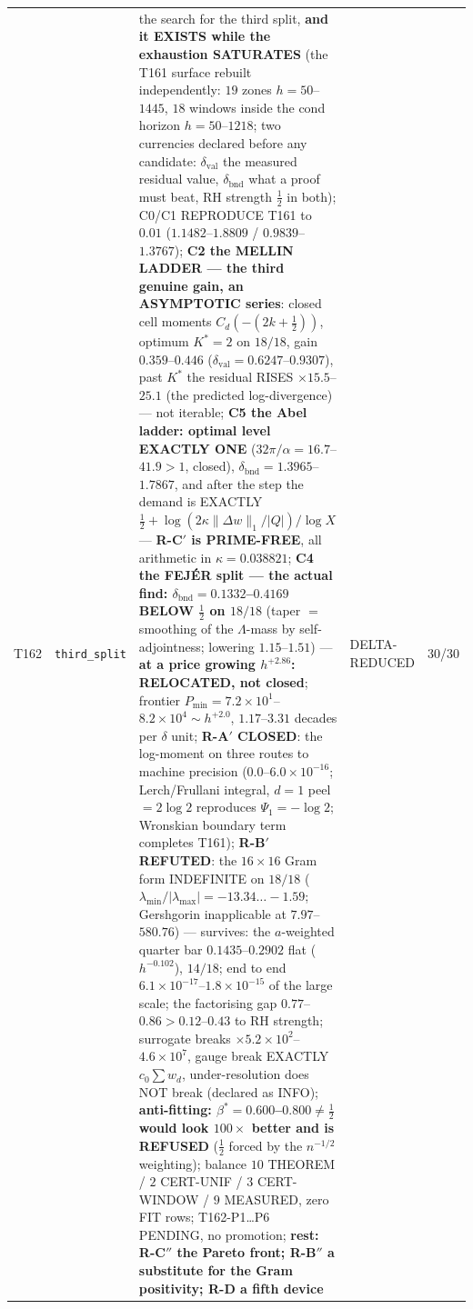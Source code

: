 \documentclass[11pt,a4paper]{article}
\begin{document}
{\begin{xltabular}{\linewidth}{@{}p{0.95cm} >{\raggedright\arraybackslash}p{3.1cm} Y >{\raggedright\scriptsize\arraybackslash}p{3.35cm} p{1.15cm}@{}}
T162 & \texttt{\scriptsize third\_\allowbreak split} & the search for the third split, \textbf{and it EXISTS while the exhaustion SATURATES} (the T161 surface rebuilt independently: $19$ zones $h=50$--$1445$, $18$ windows inside the cond horizon $h=50$--$1218$; two currencies declared before any candidate: $\delta_{\mathrm{val}}$ the measured residual value, $\delta_{\mathrm{bnd}}$ what a proof must beat, RH strength $\tfrac12$ in both); C0/C1 REPRODUCE T161 to $0.01$ ($1.1482$--$1.8809$ / $0.9839$--$1.3767$); \textbf{C2 the MELLIN LADDER --- the third genuine gain, an ASYMPTOTIC series}: closed cell moments $C_d(-(2k+\tfrac12))$, optimum $K^*=2$ on $18/18$, gain $0.359$--$0.446$ ($\delta_{\mathrm{val}}=0.6247$--$0.9307$), past $K^*$ the residual RISES $\times15.5$--$25.1$ (the predicted log-divergence) --- not iterable; \textbf{C5 the Abel ladder: optimal level EXACTLY ONE} ($32\pi/\alpha=16.7$--$41.9>1$, closed), $\delta_{\mathrm{bnd}}=1.3965$--$1.7867$, and after the step the demand is EXACTLY $\tfrac12+\log(2\kappa\|\Delta w\|_1/|Q|)/\log X$ --- \textbf{R-C$'$ is PRIME-FREE}, all arithmetic in $\kappa=0.038821$; \textbf{C4 the FEJ\'ER split --- the actual find: $\delta_{\mathrm{bnd}}=0.1332$--$0.4169$ BELOW $\tfrac12$ on $18/18$} (taper $=$ smoothing of the $\Lambda$-mass by self-adjointness; lowering $1.15$--$1.51$) --- \textbf{at a price growing $h^{+2.86}$: RELOCATED, not closed}; frontier $P_{\min}=7.2\times10^{1}$--$8.2\times10^{4}\sim h^{+2.0}$, $1.17$--$3.31$ decades per $\delta$ unit; \textbf{R-A$'$ CLOSED}: the log-moment on three routes to machine precision ($0.0$--$6.0\times10^{-16}$; Lerch/Frullani integral, $d=1$ peel $=2\log2$ reproduces $\Psi_1=-\log2$; Wronskian boundary term completes T161); \textbf{R-B$'$ REFUTED}: the $16\times16$ Gram form INDEFINITE on $18/18$ ($\lambda_{\min}/|\lambda_{\max}|=-13.34\ldots-1.59$; Gershgorin inapplicable at $7.97$--$580.76$) --- survives: the $a$-weighted quarter bar $0.1435$--$0.2902$ flat ($h^{-0.102}$), $14/18$; end to end $6.1\times10^{-17}$--$1.8\times10^{-15}$ of the large scale; the factorising gap $0.77$--$0.86>0.12$--$0.43$ to RH strength; surrogate breaks $\times5.2\times10^{2}$--$4.6\times10^{7}$, gauge break EXACTLY $c_0\sum w_d$, under-resolution does NOT break (declared as INFO); \textbf{anti-fitting: $\beta^*=0.600$--$0.800\ne\tfrac12$ would look $100\times$ better and is REFUSED} ($\tfrac12$ forced by the $n^{-1/2}$ weighting); balance $10$ THEOREM / $2$ CERT-UNIF / $3$ CERT-WINDOW / $9$ MEASURED, zero FIT rows; T162-P1\ldots P6 PENDING, no promotion; \textbf{rest: R-C$''$ the Pareto front; R-B$''$ a substitute for the Gram positivity; R-D a fifth device} & DELTA-REDUCED & 30/30\\

\end{xltabular}}
\end{document}
